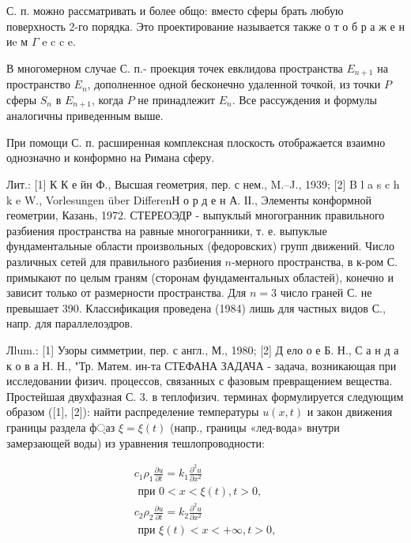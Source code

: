 \documentclass[10pt]{article}
\begin{document}
С. п. можно рассматривать и более общо: вместо сферы брать любую поверхность 2-го порядка. Это проектирование называется также о т о б р а ж е н иe м $\Gamma$ e c c e.



В многомерном случае С. п.- проекция точек евклидова пространства $E_{n+1}$ на пространство $E_{n}$, дополненное одной бесконечно удаленной точкой, из точки $P$ сферы $S_{n}$ в $E_{n+1}$, когда $P$ не принадлежит $E_{n}$. Все рассуждения и формулы аналогичны приведенным выше.



При помощи С. п. расширенная комплексная плоскость отображается взаимно однозначно и конформно на Римана сферу.



Лит.: [1] К К е йн Ф., Высшая геометрия, пер. с нем., M.--J., 1939; [2] B l a s c h k e W., Vorlesungen über DifferenН о р д е н А. ІІ., Элементы конформной геометрии, Казань, 1972. СТЕРЕОЭДР - выпуклый многогранник правильного разбиения пространства на равные многогранники, т. е. выпуклые фундаментальные области произвольных (федоровских) групп движений. Число различных сетей для правильного разбиения $n$-мерного пространства, в к-ром С. примыкают по целым граням (сторонам фундаментальных областей), конечно и зависит только от размерности пространства. Для $n=3$ число граней С. не превышает 390. Классификация проведена (1984) лишь для частных видов С., напр. для параллелоэдров.



Лlum.: [1] Узоры симметрии, пер. с англ., М., 1980; [2] Д ело о е Б. Н., С а н д а к о в а Н. Н., "Тр. Матем. ин-та СТЕФАНА ЗАДАЧА - задача, возникающая при исследовании физич. процессов, связанных с фазовым превращением вещества. Простейшая двухфазная С. 3. в теплофизич. терминах формулируется следующим образом ([1], [2]): найти распределение температуры $u(x, t)$ и закон движения границы раздела ф্аз $\xi=\xi(t)$ (напр., границы «лед-вода» внутри замерзающей воды) из уравнения тешлопроводности:



\[

\begin{gathered}

c_{1} \rho_{1} \frac{\partial u}{\partial t}=k_{1} \frac{\partial^{2} u}{\partial x^{2}} \\

\text { при } 0<x<\xi(t), t>0, \\

c_{2} \rho_{2} \frac{\partial u}{\partial t}=k_{2} \frac{\partial^{2} u}{\partial x^{2}} \\

\text { при } \xi(t)<x<+\infty, t>0,

\end{gathered}

\]
\end{document}
